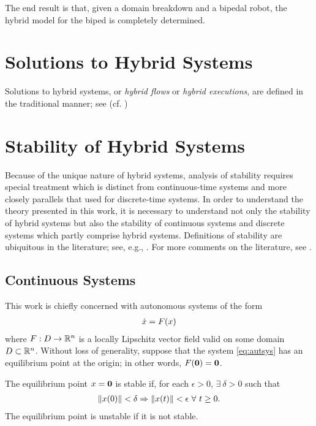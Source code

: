 The end result is that, given a domain breakdown and a bipedal robot, the hybrid model for the biped is completely determined.
%

\section{Solutions to Hybrid Systems} \label{sec:hsys-sol}
Solutions to hybrid systems, or {\em hybrid flows} or {\em hybrid executions},
are defined in the traditional manner; see \cite{}
(cf. \cite{Ye1998})


\section{Stability of Hybrid Systems} \label{sec:hsys-stability}

Because of the unique nature of hybrid systems, analysis of stability requires
special treatment which is distinct from continuous-time systems and more
closely parallels that used for discrete-time systems.
%
In order to understand the theory presented in this work, it is necessary to
understand not only the stability of hybrid systems but also the stability of
continuous systems and discrete systems which partly comprise hybrid systems.
%
Definitions of stability are ubiquitous in the literature; see, e.g.,
\cite{Khalil2002,Teschl2012,Vidyasagar1993}.
%
For more comments on the literature, see .

\subsection{Continuous Systems}
This work is chiefly concerned with autonomous systems of the form
\begin{align}
  \label{eq:autsys}
  {\dot {x}} = F(x)
\end{align}
where $F : D \to \mathbb{R}^{n}$ is a locally Lipschitz vector field valid on some domain
$D \subset \mathbb{R}^{n}$.
%
Without loss of generality, suppose that the system \eqref{eq:autsys} has an equilibrium point at the
origin;
%
in other words, $F({\mathbf 0}) = {\mathbf 0}$.
%
\begin{definition}
  The equilibrium point $x = {\mathbf 0}$ is stable if, for each $\epsilon > 0$,
  $\exists \ \delta > 0$ such that
  \begin{align*}
    \|x(0)\| < \delta \Rightarrow \|x(t)\| < \epsilon \ \forall \ t
    \geq 0.
  \end{align*}
  The equilibrium point is unstable if it is not stable.
\end{definition}

